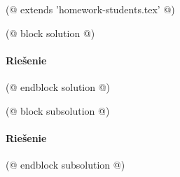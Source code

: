 (@ extends 'homework-students.tex' @)

(@ block solution @)
    \paragraph{Riešenie}
(@ endblock solution @)

(@ block subsolution @)
    \paragraph{Riešenie}
(@ endblock subsolution @)
